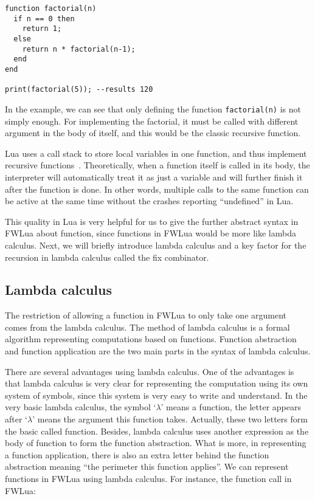 \begin{verbatim}
function factorial(n)
  if n == 0 then
    return 1;
  else
    return n * factorial(n-1);
  end
end

print(factorial(5)); --results 120
\end{verbatim}

In the example, we can see that only defining the function {\tt factorial(n)} is not simply enough. For implementing the factorial, it must be called with different argument in the body of itself, and this would be the classic recursive function.

Lua uses a call stack to store local variables in one function, and thus implement recursive functions~\cite{begLua}. Theoretically, when a function itself is called in its body, the interpreter will automatically treat it as just a variable and will further finish it after the function is done. In other words, multiple calls to the same function can be active at the same time without the crashes reporting ``undefined'' in Lua.

This quality in Lua is very helpful for us to give the further abstract syntax in FWLua about function, since functions in FWLua would be more like lambda calculus. Next, we will briefly introduce lambda calculus and a key factor for the recursion in lambda calculus called the fix combinator.

\subsection{Lambda calculus}
The restriction of allowing a function in FWLua to only take one argument comes from the lambda calculus. The method of lambda calculus is a formal algorithm representing computations based on functions. Function abstraction and function application are the two main parts in the syntax of lambda calculus. 

There are several advantages using lambda calculus. One of the advantages is that lambda calculus is very clear for representing the computation using its own system of symbols, since this system is very easy to write and understand. In the very basic lambda calculus, the symbol `$\lambda$' means a function, the letter appears after `$\lambda$' means the argument this function takes.
Actually, these two letters form the basic called function.
Besides, lambda calculus uses another expression as the body of function to form the function abstraction. What is more, in representing a function application, there is also an extra letter behind the function abstraction meaning ``the perimeter this function applies''. We can represent functions in FWLua using lambda calculus. For instance, the function call in FWLua:

